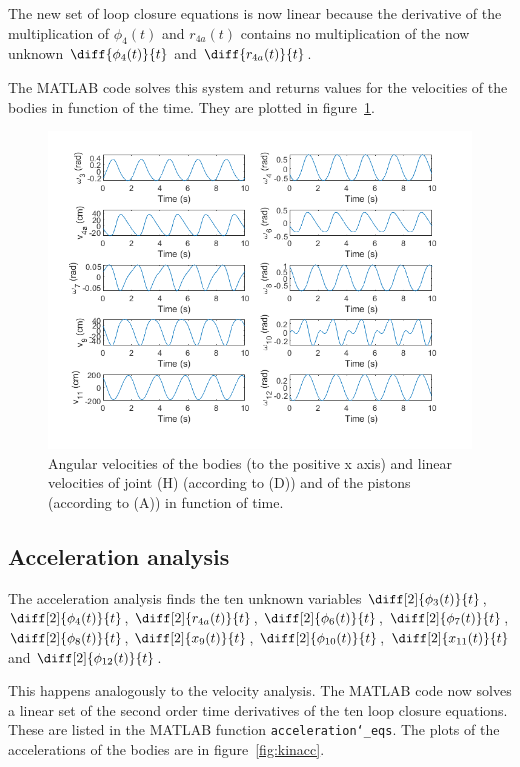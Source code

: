 \documentclass[a4paper]{article}
\begin{document}
The new set of loop closure equations is now linear because the derivative of the multiplication of \(\phi_4(t)\) and \(r_{4a}(t)\) contains no multiplication of the now unknown \(\diff{\phi_4(t)}{t}\) and \(\diff{r_{4a}(t)}{t}\).

The MATLAB code solves this system and returns values for the velocities of the bodies in function of the time. They are plotted in figure~\ref{fig:kinvel}.

\begin{figure}[h]
	\centering
	
	\includegraphics[width = \textwidth]{kinvel.png}
	
	\caption{Angular velocities of the bodies (to the positive x axis) and linear velocities of joint (H) (according to (D)) and of the pistons (according to (A)) in function of time.}
	\label{fig:kinvel}
	
\end{figure}

\subsection{Acceleration analysis}

The acceleration analysis finds the ten unknown variables \(\diff[2]{\phi_3(t)}{t}\), \(\diff[2]{\phi_4(t)}{t}\), \(\diff[2]{r_{4a}(t)}{t}\), \(\diff[2]{\phi_6(t)}{t}\), \(\diff[2]{\phi_7(t)}{t}\), \(\diff[2]{\phi_8(t)}{t}\), \(\diff[2]{x_9(t)}{t}\), \(\diff[2]{\phi_{10}(t)}{t}\), \(\diff[2]{x_{11}(t)}{t}\) and \(\diff[2]{\phi_{12}(t)}{t}\).

This happens analogously to the velocity analysis. The MATLAB code now solves a linear set of the second order time derivatives of the ten loop closure equations. These are listed in the MATLAB function \texttt{acceleration\char`_eqs}. The plots of the accelerations of the bodies are in figure~\ref{fig:kinacc}.
\end{document}
